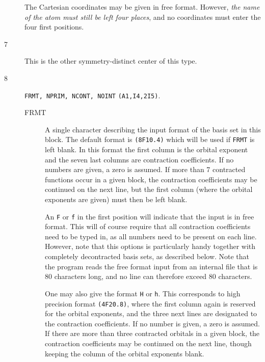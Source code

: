 \begin{description}
\begin{description}
\end{description}
The Cartesian coordinates may
be given in free format. However, {\em the name of the atom must still be
left four places}, and no coordinates must enter the four first
positions.
\item[7] This is the other symmetry-distinct center of this type.
\item[8] \verb|FRMT, NPRIM, NCONT, NOINT| {\tt (A1,I4,2I5)}.
\begin{description}
\item[FRMT] A single character describing the input format of the
basis set in this block. The default format is {\tt (8F10.4)} which
will be used if {\tt FRMT} is left blank. In this format
the first column is the orbital exponent and the seven last columns
are contraction coefficients. If no numbers are given, a zero is
assumed. If more than 7 contracted functions occur in a given block,
the contraction coefficients may be continued on the next line, but
the first column (where the orbital exponents are given) must then be
left blank.

An {\tt F} or {\tt f} in the first position will indicate that the
input is in free format. This will of course require that all
contraction coefficients need to be typed in, as all numbers need
to be present on each line. However, note that this options is
particularly handy together with completely decontracted basis
sets, as described below. Note that the program reads the free
format input from an internal file that is 80 characters long, and
no line can therefore exceed 80 characters.

One may also give the format {\tt H} or {\tt h}. This corresponds to
high precision format {\tt (4F20.8)}, where the first column again is
reserved for the orbital exponents, and the three next lines are
designated to the contraction coefficients. If no number is given, a zero
is assumed. If there are more than three contracted orbitals in a
given block, the contraction coefficients may be continued on the next
line, though keeping the column of the orbital exponents blank.


\end{description}
\end{description}
